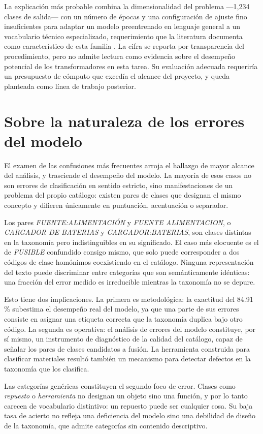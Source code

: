 La explicación más probable combina la dimensionalidad del problema —1,234 clases de salida— con un número de épocas y una configuración de ajuste fino insuficientes para adaptar un modelo preentrenado en lenguaje general a un vocabulario técnico especializado, requerimiento que la literatura documenta como característico de esta familia \cite{vaswani2017}. La cifra se reporta por transparencia del procedimiento, pero no admite lectura como evidencia sobre el desempeño potencial de los transformadores en esta tarea. Su evaluación adecuada requeriría un presupuesto de cómputo que excedía el alcance del proyecto, y queda planteada como línea de trabajo posterior.

\section{Sobre la naturaleza de los errores del modelo}
El examen de las confusiones más frecuentes arroja el hallazgo de mayor alcance del análisis, y trasciende el desempeño del modelo. La mayoría de esos casos no son errores de clasificación en sentido estricto, sino manifestaciones de un problema del propio catálogo: existen pares de clases que designan el mismo concepto y difieren únicamente en puntuación, acentuación o separador.

Los pares \textit{FUENTE:ALIMENTACIÓN} y \textit{FUENTE ALIMENTACION}, o \textit{CARGADOR DE BATERIAS} y \textit{CARGADOR:BATERIAS}, son clases distintas en la taxonomía pero indistinguibles en su significado. El caso más elocuente es el de \textit{FUSIBLE} confundido consigo mismo, que solo puede corresponder a dos códigos de clase homónimos coexistiendo en el catálogo. Ninguna representación del texto puede discriminar entre categorías que son semánticamente idénticas: una fracción del error medido es irreducible mientras la taxonomía no se depure.

Esto tiene dos implicaciones. La primera es metodológica: la exactitud del 84.91\,\% subestima el desempeño real del modelo, ya que una parte de sus errores consiste en asignar una etiqueta correcta que la taxonomía duplica bajo otro código. La segunda es operativa: el análisis de errores del modelo constituye, por sí mismo, un instrumento de diagnóstico de la calidad del catálogo, capaz de señalar los pares de clases candidatos a fusión. La herramienta construida para clasificar materiales resultó también un mecanismo para detectar defectos en la taxonomía que los clasifica.

Las categorías genéricas constituyen el segundo foco de error. Clases como \textit{repuesto} o \textit{herramienta} no designan un objeto sino una función, y por lo tanto carecen de vocabulario distintivo: un repuesto puede ser cualquier cosa. Su baja tasa de acierto no refleja una deficiencia del modelo sino una debilidad de diseño de la taxonomía, que admite categorías sin contenido descriptivo.

